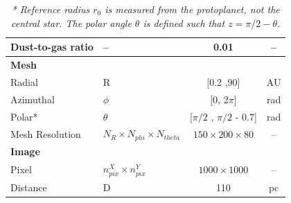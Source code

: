 \begin{table}[h]
\begin{tabular}{l l c c}
Dust-to-gas ratio & -- & 0.01 & -- \\
\midrule
\textbf{Mesh} & & & \\
Radial & R & [0.2 ,90] & AU \\
Azimuthal & \(\phi\) & [0, 2\(\pi\)] & rad \\
Polar* & \(\theta\) & [\(\pi/2\) , \(\pi/2\) - 0.7] & rad \\
Mesh Resolution & \(N_R \times N_{phi} \times N_{theta}\) & \(150 \times 200 \times 80\) & -- \\
\midrule
\textbf{Image} & & & \\
Pixel & \(n_{pix}^X \times n_{pix}^Y\) & \(1000 \times 1000\) & -- \\
Distance & D & 110 & pc\\

\bottomrule
\end{tabular}
\caption*{\scriptsize\textit{* Reference radius \(r_0\) is measured from the protoplanet, not the central star. The polar angle \(\theta\) is defined such that \(z = \pi/2 - \theta\).}}
\end{table}


\clearpage